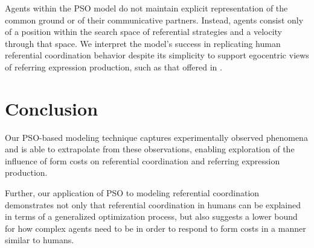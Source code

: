 \documentclass[a4paper,11pt]{article}
\begin{document}
Agents within the PSO model do not maintain explicit representation of the common ground or of their communicative partners. Instead, agents consist only of a position within the search space of referential strategies and a velocity through that space. We interpret the model's success in replicating human referential coordination behavior despite its simplicity to support egocentric views of referring expression production, such as that offered in \citeauthor{horton1996} \citeyear{horton1996}.

\section{Conclusion}
Our PSO-based modeling technique captures experimentally observed phenomena and is able to extrapolate from these observations, enabling exploration of the influence of form costs on referential coordination and referring expression production.

Further, our application of PSO to modeling referential coordination demonstrates not only that referential coordination in humans can be explained in terms of a generalized optimization process, but also suggests a lower bound for how complex agents need to be in order to respond to form costs in a manner similar to humans.




\end{document}
